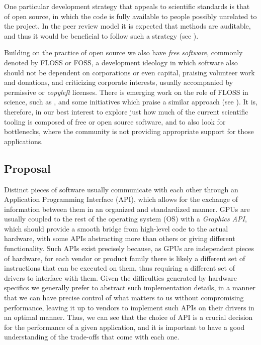 \documentclass[11pt, conference, onecolumn, final]{IEEEtran}
\begin{document}
One particular development strategy that appeals to scientific standards is
that of open source, in which the code is fully available to people possibly
unrelated to the project.
In the peer review model it is expected that methods are auditable, and thus
it would be beneficial to follow such a strategy (see
\cite{barba2022defining}).

Building on the practice of open source we also have \textit{free software},
commonly denoted by FLOSS or FOSS, a development ideology in which software
also should not be dependent on corporations or even capital, praising
volunteer work and donations, and criticizing corporate interests, usually
accompanied by permissive or \textit{copyleft} licenses.
There is emerging work on the role of FLOSS in science, such as
\cite{fortunato2021case}, and some initiatives which praise a similar approach
(see \cite{katz2018community, barker2022introducing}).
It is, therefore, in our best interest to explore just how much of the current
scientific tooling is composed of free or open source software, and to also
look for bottlenecks, where the community is not providing appropriate support
for those applications.

\subsection{Proposal} \label{sec:intro:proposal}

Distinct pieces of software usually communicate with each other through an
Application Programming Interface (API), which allows for the exchange of
information between them in an organized and standardized manner.
GPUs are usually coupled to the rest of the operating system (OS) with a
\textit{Graphics API}, which should provide a smooth bridge from high-level
code to the actual hardware, with some APIs abstracting more than others or
giving different functionality.
Such APIs exist precisely because, as GPUs are independent pieces of hardware,
for each vendor or product family there is likely a different set of
instructions that can be executed on them, thus requiring a different set of
drivers to interface with them.
Given the difficulties generated by hardware specifics we generally prefer to
abstract such implementation details, in a manner that we can have precise
control of what matters to us without compromising performance, leaving it up
to vendors to implement such APIs on their drivers in an optimal manner.
Thus, we can see that the choice of API is a crucial decision for the
performance of a given application, and it is important to have a good
understanding of the trade-offs that come with each one.
\end{document}
